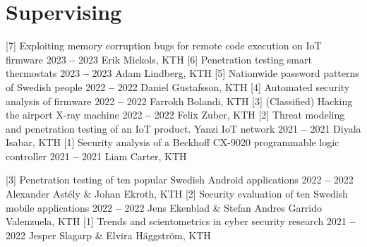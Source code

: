 

\section{Supervising}

  

        \titleYearOrg
            {[7] Exploiting memory corruption bugs for remote code execution on IoT firmware}
            {2023 \textbf{--} 2023}
            {Erik Mickols, KTH}
        \titleYearOrg
            {[6] Penetration testing smart thermostats}
            {2023 \textbf{--} 2023}
            {Adam Lindberg, KTH}
        \titleYearOrg
            {[5] Nationwide password patterns of Swedish people}
            {2022 \textbf{--} 2022}
            {Daniel Gustafsson, KTH}
        \titleYearOrg
            {[4] Automated security analysis of firmware}
            {2022 \textbf{--} 2022}
            {Farrokh Bolandi, KTH}
        \titleYearOrg
            {[3] (Classified) Hacking the airport X-ray machine}
            {2022 \textbf{--} 2022}
            {Felix Zuber, KTH}
        \titleYearOrg
            {[2] Threat modeling and penetration testing of an IoT product. Yanzi IoT network}
            {2021 \textbf{--} 2021}
            {Diyala Isabar, KTH}
        \titleYearOrg
            {[1] Security analysis of a Beckhoff CX-9020 programmable logic controller}
            {2021 \textbf{--} 2021} 
            {Liam Carter, KTH}
    
    \itemizeCVEnd


        
        \titleYearOrg
            {[3] Penetration testing of ten popular Swedish Android applications}
            {2022 \textbf{--} 2022}
            {Alexander Astély \& Johan Ekroth, KTH}
        \titleYearOrg
            {[2] Security evaluation of ten Swedish mobile applications}
            {2022 \textbf{--} 2022}
            {Jens Ekenblad \& Stefan Andres Garrido Valenzuela, KTH}
        \titleYearOrg
            {[1] Trends and scientometrics in cyber security research}
            {2021 \textbf{--} 2022}
            {Jesper Slagarp \& Elvira Häggström, KTH}
    
    \itemizeCVEnd
    